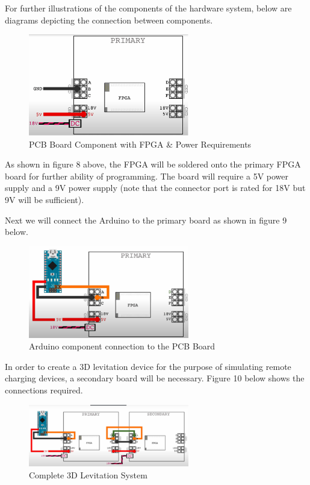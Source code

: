 \documentclass[12pt, titlepage]{article}
\begin{document}
For further illustrations of the components of the hardware system, below are diagrams depicting the connection between components.
\par 

\begin{figure}[htp]
  \centering
  \includegraphics[width=7cm]{images/Figure8.png}
  \caption[PCB and Power]{PCB Board Component with FPGA \& Power Requirements}
  \label{fig:figure8}
\end{figure}

As shown in figure 8 above, the FPGA will be soldered onto the primary FPGA board for further ability of programming. The board will require a 5V power supply and a 9V power supply (note that the connector port is rated for 18V but 9V will be sufficient). 
\par 
Next we will connect the Arduino to the primary board as shown in figure 9 below.
\par

\begin{figure}[htp]
  \centering
  \includegraphics[width=7cm]{images/Figure9.png}
  \caption[Arduino Connectrion]{Arduino component connection to the PCB Board }
  \label{fig:figure9}
\end{figure}

In order to create a 3D levitation device for the purpose of simulating remote charging devices, a secondary board will be necessary. Figure 10 below shows the connections required.
\par 
\begin{figure}[htp]
  \centering
  \includegraphics[width=7cm]{images/Figure10.png}
  \caption[Hardware Complete]{Complete 3D Levitation System}
  \label{fig:figure10}
\end{figure}
\end{document}
